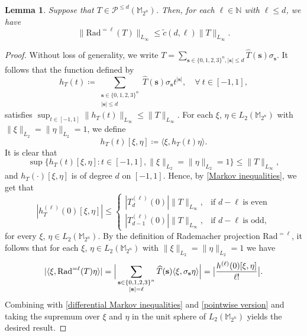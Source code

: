 \documentclass{amsbook}
\newtheorem{lemma}[theorem]{Lemma}
\theoremstyle{definition}
\theoremstyle{remark}
\numberwithin{section}{chapter}
\numberwithin{equation}{chapter}
\newcommand{\M}{\mathbb{M}}
\newcommand{\1}{\mathbf{1}}
\newcommand{\s}{\mathbf{s}}
\begin{document}
\begin{lemma}\label{Figiel inequality}
Suppose that $T\in \mathcal{P}^{\leq d}(\M_{2^n})$. Then, for each $\ell\in \mathbb{N}$ with $\ell \leq d$, we have
\[
\big\|\mathrm{Rad}^{=\ell}(T)\big\|_{L_{\infty}}\leq \tilde{c}(d,\ell)\|T\|_{L_\infty}.
\]
\end{lemma}
\begin{proof}
Without loss of generality, we write $T=\sum_{\s\in\{0,1,2,3\}^{n},|\s|\leq d}\widehat{T}(\s)\sigma_{\s}$. It follows that the function defined by
\[
h_{T}(t)\coloneqq\sum_{\substack{\s\in \{0,1,2,3\}^{n}\\|\s|\leq d}}\widehat{T}(\s)\sigma_{\s}t^{|\s|},\quad\forall~t\in [-1,1],
\]
satisfies $\sup_{t\in[-1,1]}\|h_{T}(t)\|_{L_{\infty}}\leq \|T\|_{L_{\infty}}$. For each $\xi$, $\eta\in L_{2}(\M_{2^n})$ with $\|\xi\|_{L_{2}}=\|\eta\|_{L_{2}}=1$, we define
\[
h_{T}(t)[\xi,\eta]\coloneqq\langle \xi,h_{T}(t)\eta\rangle.
\]
It is clear that
\[
\sup\{h_{T}(t)[\xi,\eta]:t\in [-1,1],\|\xi\|_{L_{2}}=\|\eta\|_{L_{2}}=1\}\leq \|T\|_{L_{\infty}},
\]
and $h_{T}(\cdot)[\xi,\eta]$ is of degree $d$ on $[-1,1]$. Hence, by \eqref{Markov inequalities}, we get that
\begin{equation}\label{differential Markov inequalities}
|h^{(\ell)}_{T}(0)[\xi,\eta]|\leq
\begin{cases}
|T^{(\ell)}_{d}(0)|\|T\|_{L_{\infty}},&\mbox{if }d-\ell~\mbox{is even}\\
|T^{(\ell)}_{d-1}(0)|\|T\|_{L_{\infty}},&\mbox{if }d-\ell~\mbox{is odd},
\end{cases}
\end{equation}
for every $\xi$, $\eta\in L_{2}(\M_{2^n})$. By the definition of Rademacher projection $\mathrm{Rad}^{=\ell}$, it follows that for each $\xi$, $\eta\in L_{2}(\M_{2^n})$ with $\|\xi\|_{L_{2}}=\|\eta\|_{L_{2}}=1$ we have
\begin{equation}\label{pointwise version}
|\langle \xi, \mathrm{Rad}^{=\ell}(T)\eta\rangle|=\Big|\sum_{\substack{\s\in \{0,1,2,3\}^{n}\\|\s|=\ell}}\widehat{T}(\s)\langle \xi,\sigma_{\s}\eta\rangle\Big|\\
=\big|\frac{h^{(\ell)}(0)[\xi,\eta]}{\ell!}\big|.
\end{equation}
Combining with \eqref{differential Markov inequalities} and \eqref{pointwise version} and taking the supremum over $\xi$ and $\eta$ in the unit sphere of $L_{2}(\M_{2^n})$ yields the desired result.
\end{proof}
\end{document}
